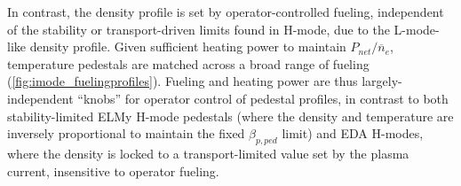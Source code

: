 \documentclass[ twoside,openright,titlepage,numbers=noenddot,headinclude,%
                footinclude=true,cleardoublepage=empty,abstractoff, %
                BCOR=5mm,paper=letter,fontsize=11pt,%
                ngerman,american,%
                ]{scrreprt}
\begin{document}
\begin{figure}[ht]
 \pushtooutside
\end{figure}

In contrast, the density profile is set by operator-controlled fueling, independent of the stability or transport-driven limits found in H-mode, due to the L-mode-like density profile.  Given sufficient heating power to maintain $P_{net}/\overline{n}_e$, temperature pedestals are matched across a broad range of fueling (\cref{fig:imode_fuelingprofiles}).  Fueling and heating power are thus largely-independent ``knobs'' for operator control of pedestal profiles, in contrast to both stability-limited ELMy H-mode pedestals (where the density and temperature are inversely proportional to maintain the fixed $\beta_{p,ped}$ limit) and EDA H-modes, where the density is locked to a transport-limited value set by the plasma current, insensitive to operator fueling.
\end{document}
